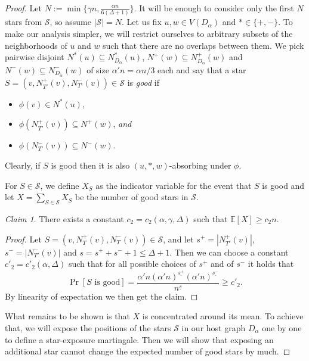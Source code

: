 \documentclass[10pt, a4paper]{article}
\theoremstyle{remark}
\newtheorem{claim}{Claim}
\newcommand*{\E}{\ensuremath{\mathbb{E}}}
\begin{document}
\begin{proof}
    Let $N := \min \{\gamma n, \frac{\alpha n}{6(\Delta+1)}\}$. It will be enough to consider only the first $N$ stars from $\mathcal{S}$, so assume $|\mathcal{S}|=N$.
    Let us fix $u, w \in V(D_\alpha)$ and $* \in \{+, -\}$.
    To make our analysis simpler, we will restrict ourselves to arbitrary subsets of the neighborhoods of $u$ and $w$ such that there are no overlaps between them.
    We pick pairwise disjoint $N^*(u) \subseteq N_{D_\alpha}^*(u)$, $N^+(w) \subseteq N_{D_\alpha}^+(w)$ and $N^-(w) \subseteq N_{D_\alpha}^-(w)$ of size $\alpha' n = \alpha n/3 $ each and say that a star $S = (v, N_{T'}^+(v), N_{T'}^-(v)) \in \mathcal{S}$ is \emph{good} if 
    \begin{itemize}
        \item $\phi(v) \in N^*(u)$,
        \item $\phi(N_{T'}^+(v)) \subseteq N^+(w)$, \emph{and}
        \item $\phi(N_{T'}^-(v)) \subseteq N^-(w).$
    \end{itemize}
    Clearly, if $S$ is good then it is also $(u, *, w)$-absorbing under $\phi$.

    For $S \in \mathcal{S}$, we define $X_S$ as the indicator variable for the event that $S$ is good and let $X = \sum_{S \in \mathcal{S}} X_S$ be the number of good stars in $\mathcal{S}$.

    \vspace{10pt}
    
    \begin{claim}
        There exists a constant $c_2 =  c_2(\alpha, \gamma, \Delta)$ such that $\E[X] \geq  c_2n$.
    \end{claim}
    \begin{proof}
        Let $S = (v, N_T^+(v), N_T^-(v)) \in \mathcal{S}$, and let  $ s^+ = |N_{T'}^+(v)| $, $s^- = |N_{T'}^-(v)|$ and $s = s^+ + s^- + 1 \leq \Delta + 1$.
        Then we can choose a constant $c'_2 = c'_2(\alpha, \Delta)$ such that for all possible choices of $s^+$ and of $s^-$ it holds that
        \[ \Pr[S \text{ is good}] = \frac{\alpha'n (\alpha'n)^{\underline{s^+}}(\alpha'n)^{\underline{s^-}}}{n^{\underline{s}}} \geq c'_2.\]
        By linearity of expectation we then get the claim.
   \end{proof}
    \vspace{10pt}

    What remains to be shown is that $X$ is concentrated around its mean.
    To achieve that, we will expose the positions of the stars $\mathcal{S}$ in our host graph $D_\alpha$ one by one to define a star-exposure martingale.
    Then we will show that exposing an additional star cannot change the expected number of good stars by much.


\end{proof}
\end{document}
